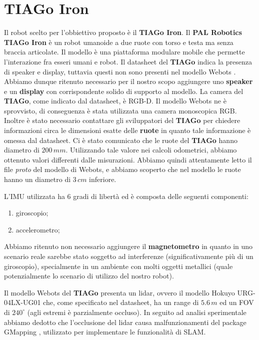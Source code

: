 \documentclass[a4paper]{article}
\begin{document}
	
	\section{TIAGo Iron}\label{sec:TIAGo-Iron} 
	Il robot scelto per l'obbiettivo proposto è il \textbf{TIAGo Iron}. \newline Il \textbf{PAL Robotics TIAGo Iron} \cite{pages2016tiago} è un robot umanoide a due ruote con torso e testa ma senza braccia articolate. Il modello è una piattaforma modulare mobile che permette l'interazione fra esseri umani e robot. \newline
	Il datasheet del \textbf{TIAGo} \cite{tiago_datasheet} indica la presenza di speaker e display, tuttavia questi non sono presenti nel modello Webots \cite{tiagoiron}. Abbiamo dunque ritenuto necessario per il nostro scopo aggiungere uno \textbf{speaker} e un \textbf{display} con corrispondente solido di supporto al modello.
	La camera del \textbf{TIAGo}, come indicato dal datasheet, è RGB-D. Il modello Webots ne è sprovvisto, di conseguenza è stata utilizzata una camera monoscopica RGB.
	Inoltre è stato necessario contattare gli sviluppatori del \textbf{TIAGo} per chiedere informazioni circa le dimensioni esatte delle \textbf{ruote} in quanto tale informazione è omessa dal datasheet. Ci è stato comunicato che le ruote del \textbf{TIAGo} hanno diametro di $200\,mm$. Utilizzando tale valore nei calcoli odometrici, abbiamo ottenuto valori differenti dalle misurazioni. Abbiamo quindi attentamente letto il file \textit{proto} del modello di Webots, e abbiamo scoperto che nel modello le ruote hanno un diametro di $3\,cm$ inferiore. 
	
    L'IMU utilizzata ha 6 gradi di libertà ed è composta delle seguenti componenti:
	\begin{enumerate}
		\item giroscopio;	
		\item accelerometro;
	\end{enumerate}
	Abbiamo ritenuto non necessario aggiungere il \textbf{magnetometro} in quanto in uno scenario reale sarebbe stato soggetto ad interferenze (significativamente più di un giroscopio), specialmente in un ambiente con molti oggetti metallici (quale potenzialmente lo scenario di utilizzo del nostro robot).
	
	Il modello Webots del \textbf{TIAGo} presenta un lidar, ovvero il modello Hokuyo URG-04LX-UG01 \cite{lidarspecs} che, come specificato nel datasheet,  ha un range di $5.6\,m$ ed un FOV di $240^{\circ}$ (agli estremi è parzialmente occluso). In seguito ad analisi sperimentale abbiamo dedotto che l'occlusione del lidar causa malfunzionamenti del package GMapping \cite{grisettiyz2005improving}, utilizzato per implementare le funzionalità di SLAM.
\end{document}

